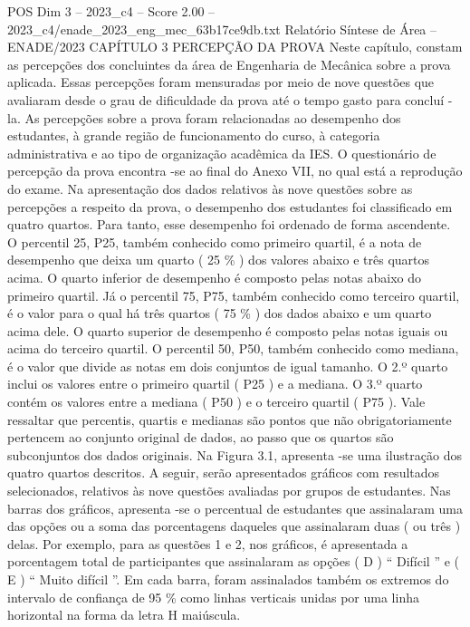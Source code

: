 \begin{textsample}{POS Dim 3 – 2023\_c4 – Score 2.00 – 2023\_c4/enade\_2023\_eng\_mec\_63b17ce9db.txt}  \label{ex:f3_pos_100}
Relatório Síntese de Área – ENADE/2023 CAPÍTULO 3 PERCEPÇÃO DA PROVA Neste capítulo, constam as percepções dos concluintes da área de Engenharia de Mecânica sobre a prova aplicada.
Essas percepções foram mensuradas por meio de nove questões que avaliaram desde o grau de dificuldade da prova até o tempo gasto para concluí -la.
As percepções sobre a prova foram relacionadas ao desempenho dos estudantes, à grande região de funcionamento do curso, à categoria administrativa e ao tipo de organização acadêmica da IES.
O questionário de percepção da prova encontra -se ao final do Anexo VII, no qual está a reprodução do exame.
Na apresentação dos dados relativos às nove questões sobre as percepções a respeito da prova, o desempenho dos estudantes foi classificado em quatro quartos.
Para tanto, esse desempenho foi ordenado de forma ascendente.
O percentil 25, P25, também conhecido como primeiro quartil, é a nota de desempenho que deixa um quarto ( 25 \% ) dos valores abaixo e três quartos acima.
O quarto inferior de desempenho é composto pelas notas abaixo do primeiro quartil.
Já o percentil 75, P75, também conhecido como terceiro quartil, é o valor para o qual há três quartos ( 75 \% ) dos dados abaixo e um quarto acima dele.
O quarto superior de desempenho é composto pelas notas iguais ou acima do terceiro quartil.
O percentil 50, P50, também conhecido como mediana, é o valor que divide as notas em dois conjuntos de igual tamanho.
O 2.º quarto inclui os valores entre o primeiro quartil ( P25 ) e a mediana.
O 3.º quarto contém os valores entre a mediana ( P50 ) e o terceiro quartil ( P75 ).
Vale ressaltar que percentis, quartis e medianas são pontos que não obrigatoriamente pertencem ao conjunto original de dados, ao passo que os quartos são subconjuntos dos dados originais.
Na Figura 3.1, apresenta -se uma ilustração dos quatro quartos descritos.
A seguir, serão apresentados gráficos com resultados selecionados, relativos às nove questões avaliadas por grupos de estudantes.
Nas barras dos gráficos, apresenta -se o percentual de estudantes que assinalaram uma das opções ou a soma das porcentagens daqueles que assinalaram duas ( ou três ) delas.
Por exemplo, para as questões 1 e 2, nos gráficos, é apresentada a porcentagem total de participantes que assinalaram as opções ( D ) “ Difícil ” e ( E ) “ Muito difícil ”.
Em cada barra, foram assinalados também os extremos do intervalo de confiança de 95 \% como linhas verticais unidas por uma linha horizontal na forma da letra H maiúscula.

\end{textsample}
